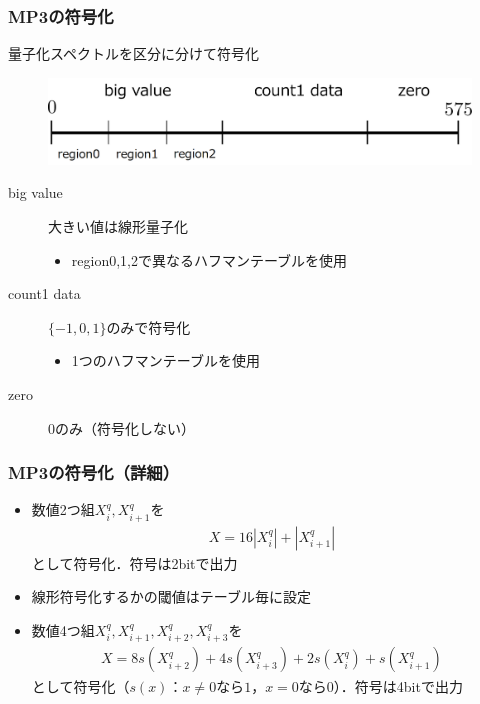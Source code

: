 \documentclass[14pt,xcolor=dvipsnames,table,dvipdfmx]{beamer}
\begin{document}
\begin{frame}[c]
    \frametitle{MP3の符号化}
    量子化スペクトルを区分に分けて符号化
    \begin{figure}
        \includegraphics[width=115mm]{./figs/huffman_coding_region_division.png}
    \end{figure}
    \begin{description}
        \item[big value] 大きい値は線形量子化
            \begin{itemize}
                \item region0,1,2で異なるハフマンテーブルを使用
            \end{itemize}
        \item[count1 data] $\{ -1, 0, 1 \}$のみで符号化
            \begin{itemize}
                \item 1つのハフマンテーブルを使用
            \end{itemize}
        \item[zero] $0$のみ（符号化しない）
    \end{description}
\end{frame}

\begin{frame}[c]
    \frametitle{MP3の符号化（詳細）}
    \begin{itemize}
        \item 数値2つ組$X_{i}^{q}, X_{i+1}^{q}$を
            \begin{align}
                X = 16 |X_{i}^{q}| + |X_{i+1}^{q}|
            \end{align}
            として符号化．符号は2bitで出力
        \item 線形符号化するかの閾値はテーブル毎に設定
    \end{itemize}
    \begin{itemize}
        \item 数値4つ組$X_{i}^{q}, X_{i+1}^{q}, X_{i+2}^{q}, X_{i+3}^{q}$を
            \begin{align}
                X = 8 s(X_{i+2}^{q}) + 4 s(X_{i+3}^{q}) + 2 s(X_{i}^{q}) + s(X_{i+1}^{q})
            \end{align}
            として符号化（$s(x)$：$x\neq 0$なら$1$，$x=0$なら$0$）．符号は4bitで出力
    \end{itemize}
\end{frame}
\end{document}
